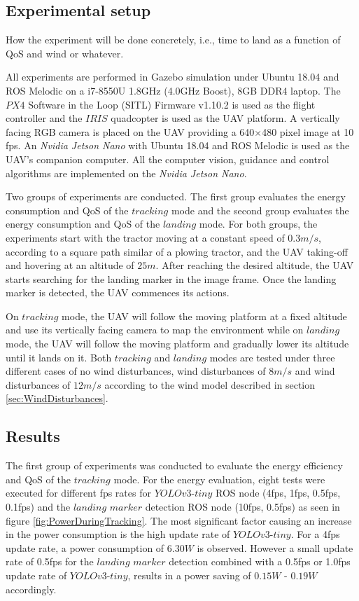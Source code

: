 \documentclass[conference]{IEEEtran}
\begin{document}
\subsection{Experimental setup}

How the experiment will be done concretely, i.e., time to land as a
function of QoS and wind or whatever.

All experiments are performed in Gazebo simulation under Ubuntu 18.04
and ROS Melodic on a i7-8550U 1.8GHz (4.0GHz Boost), 8GB DDR4
laptop. The $PX4$ Software in the Loop (SITL) Firmware v1.10.2 is used as the flight
controller and the $IRIS$ quadcopter is used as the UAV platform. A
vertically facing RGB camera is placed on the UAV providing a
640$\times$480 pixel image at 10 fps. An \emph{Nvidia Jetson Nano}
with Ubuntu 18.04 and ROS Melodic is used as the UAV's companion
computer. All the computer vision, guidance and control algorithms are
implemented on the \emph{Nvidia Jetson Nano}.

Two groups of experiments are conducted. The first group evaluates the
energy consumption and QoS of the $tracking$ mode and the second group
evaluates the energy consumption and QoS of the $landing$ mode. For
both groups, the experiments start with the tractor moving at a
constant speed of $0.3 m/s$, according to a square path similar of a
plowing tractor, and the UAV taking-off and hovering at an altitude of
$25 m$. After reaching the desired altitude, the UAV starts searching
for the landing marker in the image frame. Once the landing marker is
detected, the UAV commences its actions.


On $tracking$ mode, the UAV will follow the moving platform at a fixed
altitude and use its vertically facing camera to map the environment
while on $landing$ mode, the UAV will follow the moving platform and
gradually lower its altitude until it lands on it. Both $tracking$ and
$landing$ modes are tested under three different cases of no wind
disturbances, wind disturbances of $8 m/s$ and wind disturbances of
$12 m/s$ according to the wind model described in section
\ref{sec:WindDisturbances}.



\subsection{Results}

The first group of experiments was conducted to evaluate the 
energy efficiency and QoS of the $tracking$ mode. For the energy 
evaluation, eight tests were executed for different fps rates 
for $YOLOv3$-$tiny$ ROS node (4fps, 1fps, 0.5fps, 0.1fps) and 
the $landing$ $marker$ detection ROS node (10fps, 0.5fps) as 
seen in figure \ref{fig:PowerDuringTracking}. The most significant factor causing an increase in the power consumption is the high update  rate of $YOLOv3$-$tiny$. For a 4fps update rate, a power consumption of $6.30 W$ is observed. However a small update rate of 0.5fps for the $landing$ $marker$ detection combined with a 0.5fps or 1.0fps update  rate of $YOLOv3$-$tiny$, results in a power saving of $0.15W$ - $0.19W$  accordingly.
\end{document}
